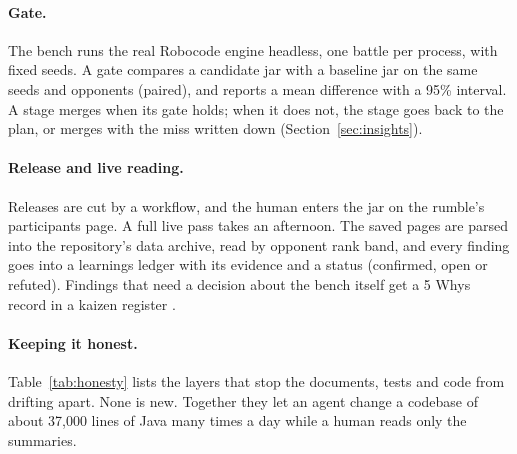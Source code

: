 \documentclass[10pt,twocolumn]{article}
\begin{document}
\paragraph{Gate.} The bench runs the real Robocode engine headless, one battle per process, with
fixed seeds. A gate compares a candidate jar with a baseline jar on the same seeds and opponents
(paired), and reports a mean difference with a 95\% interval. A stage merges when its gate holds;
when it does not, the stage goes back to the plan, or merges with the miss written down
(Section~\ref{sec:insights}).

\paragraph{Release and live reading.} Releases are cut by a workflow, and the human enters the jar
on the rumble's participants page. A full live pass takes an afternoon. The saved pages are parsed
into the repository's data archive, read by opponent rank band, and every finding goes into a
learnings ledger with its evidence and a status (confirmed, open or refuted). Findings that need
a decision about the bench itself get a 5 Whys record in a kaizen register \cite{sobek2008}.

\paragraph{Keeping it honest.} Table~\ref{tab:honesty} lists the layers that stop the documents,
tests and code from drifting apart. None is new. Together they let an agent change a codebase of about 37,000 lines of Java many times a day while a human reads only the summaries.
\end{document}
